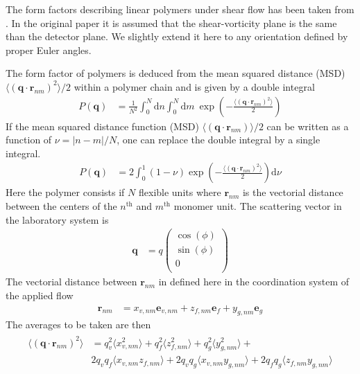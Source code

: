 The form factors describing linear polymers under shear flow has been taken from \cite{Korolkovas2019}.
In the original paper it is assumed that the shear-vorticity plane is the same than the detector plane. We slightly extend it here to any orientation defined by proper Euler angles.

The form factor of polymers is deduced from the mean squared distance (MSD) $\langle(\mathbf{q}\cdot\mathbf{r}_{nm})^2\rangle/2$ within a polymer chain and is given by a double integral
\begin{align}
  P(\mathbf{q}) & = \frac{1}{N^2}\int_0^N\mathrm{d}n\int_0^N\mathrm{d}m\: \exp\left(-\frac{\langle(\mathbf{q}\cdot\mathbf{r}_{nm})^2\rangle}{2}\right)
\end{align}
If the mean squared distance function (MSD) $\langle(\mathbf{q}\cdot\mathbf{r}_{nm})\rangle/2$ can be written as a function of $\nu=\left|n-m\right|/N$, one can replace the double integral by a single integral.
\begin{align} \label{eq:IQ_MSD}
 P(\mathbf{q}) & = 2\int_0^1 (1-\nu) \exp\left(-\frac{\langle(\mathbf{q}\cdot\mathbf{r}_{nm})^2\rangle}{2}\right) \mathrm{d}\nu
\end{align}
Here the polymer consists if $N$ flexible units where $\mathbf{r}_{nm}$ is the vectorial distance between the centers of the $n^\mathrm{th}$ and $m^\mathrm{th}$ monomer unit.
The scattering vector in the laboratory system is
\begin{align}
\mathbf{q} &= q
\left(
    \begin{array}{c}
        \cos(\phi) \\
        \sin(\phi) \\
        0 \\
    \end{array}
\right)
\end{align}
The vectorial distance between  $\mathbf{r}_{nm}$ in defined here in the coordination system of the applied flow
\begin{align}
\mathbf{r}_{nm} &= x_{v,nm} \mathbf{e}_{v,nm} + z_{f,nm} \mathbf{e}_{f} + y_{g,nm} \mathbf{e}_{g}
\end{align}
The averages to be taken are then
\begin{align}
\begin{split} \label{MSDfull}
 \langle(\mathbf{q}\cdot\mathbf{r}_{nm})^2\rangle  & = q_v^2 \langle x_{v,nm}^2\rangle + q_f^2 \langle z_{f,nm}^2\rangle + q_g^2 \langle y_{g,nm}^2\rangle + \\
 & 2q_v q_f \langle x_{v,nm} z_{f,nm}\rangle + 2q_v q_g \langle x_{v,nm} y_{g,nm}\rangle + 2q_fq_g \langle z_{f,nm}y_{g,nm}\rangle
 \end{split}
\end{align}
